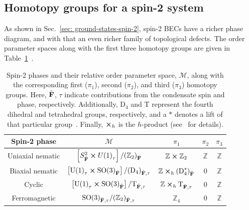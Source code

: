\subsection{Homotopy groups for a spin-2 system}
As shown in Sec.~\ref{sec: ground-states-spin-2}, spin-2 BECs have a richer
phase diagram, and with that an even richer family of topological defects.
The order parameter spaces along with the first three homotopy groups are
given in Table~\ref{tab: spin-2-homotopy-groups}~\cite{Mermin1979,Kawaguchi2012,
Kobayashi2012}.
\begin{table}
    \centering
    \begin{tabular}{ccccc}
        \toprule
        Spin-2 phase & \(\mathcal{M}\) & \(\pi_1\) & \(\pi_2\) & \(\pi_3\) \\
        \midrule
        Uniaxial nematic & \(\left[S^2_{\hat{\vb{F}}} \cross {U(1)}_\tau\right]
        / {({\mathbb{Z}}_2)}_{\hat{\vb{F}}} \)
        & \(\mathbb{Z} \cross \mathbb{Z}_2\)
        & \(\mathbb{Z}\) & \(\mathbb{Z} \) \\
        Biaxial nematic & \(\left[{\text{U}(1)}_\tau \cross
        {\text{SO}(3)}_{\hat{\vb{F}}}\right]
        / {(\text{D}_4)}_{\hat{\vb{F}}, \tau}\)
        & \(\mathbb{Z} \cross_h {(\text{D}^\ast_4)}_{\hat{\vb{F}}}\) & 0
        & \(\mathbb{Z}\) \\
        Cyclic & \(\left[{\text{U}(1)}_\tau
        \cross {\text{SO}(3)}_{\hat{\vb{F}}}\right]
        / \text{T}_{\hat{\vb{F}}, \tau}\)
        & \(\mathbb{Z} \cross_h \text{T}_{\hat{\vb{F}}, \tau}\) & 0
        & \(\mathbb{Z}\) \\
        Ferromagnetic & \({\text{SO}(3)}_{\hat{\vb{F}}, \tau}
        / {({\mathbb{Z}}_2)}_{\hat{\vb{F}}, \tau}\)
        & \({\mathbb{Z}}_4\) & 0 & \(\mathbb{Z}\) \\
        \bottomrule
    \end{tabular}
    \caption{\label{tab: spin-2-homotopy-groups}Spin-2 phases and their relative
    order parameter space, \(\mathcal{M}\), along with the corresponding first
    (\(\pi_1\)), second (\(\pi_2\)), and third (\(\pi_3\)) homotopy groups.
    Here, \(\hat{\vb{F}}\), \(\tau \) indicate contributions from the
    condensate spin and phase, respectively.
    Additionally, \(\text{D}_4\) and T represent the fourth dihedral and
    tetrahedral groups, respectively, and a \(\ast \) denotes a lift of that
    particular group~\cite{Mermin1979}.
    Finally, \(\cross_h\) is the \(h\)-product (see~\cite{Kobayashi2012} for
    details).}
\end{table}

